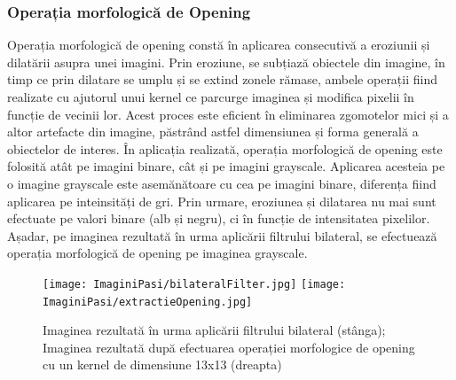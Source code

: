 \documentclass[12pt]{article}
\begin{document}
\subsubsection{Operația morfologic\u{a} de Opening}
Operația morfologic\u{a} de opening const\u{a} \^{i}n aplicarea consecutiv\u{a} a eroziunii și dilat\u{a}rii asupra unei imagini. Prin eroziune, se subțiaz\u{a} obiectele din imagine, \^{i}n timp ce prin dilatare se umplu și se extind zonele r\u{a}mase, ambele operații fiind realizate cu ajutorul unui kernel ce parcurge imaginea și modifica pixelii \^{i}n funcție de vecinii lor. Acest proces este eficient \^{i}n eliminarea zgomotelor mici și a altor artefacte din imagine, p\u{a}str\^{a}nd astfel dimensiunea și forma general\u{a} a obiectelor de interes. \^{I}n aplicația realizat\u{a}, operația morfologic\u{a} de opening este folosit\u{a} at\^{a}t pe imagini binare, c\^{a}t și pe imagini grayscale. Aplicarea acesteia pe o imagine grayscale este asem\u{a}n\u{a}toare cu cea pe imagini binare, diferența fiind aplicarea pe inteinsit\u{a}ți de gri. Prin urmare, eroziunea și dilatarea nu mai sunt efectuate pe valori binare (alb și negru), ci \^{i}n funcție de intensitatea pixelilor. Așadar, pe imaginea rezultat\u{a} \^{i}n urma aplic\u{a}rii filtrului bilateral, se efectueaz\u{a} operația morfologic\u{a} de opening pe imaginea grayscale.

\begin{figure}[H]
  \centering
  \texttt{[image: ImaginiPasi/bilateralFilter.jpg]}\hfill
  \texttt{[image: ImaginiPasi/extractieOpening.jpg]}
  \caption{Imaginea rezultat\u{a} \^{i}n urma aplic\u{a}rii filtrului bilateral (st\^{a}nga); Imaginea rezultat\u{a} dup\u{a} efectuarea operației morfologice de opening cu un kernel de dimensiune 13x13 (dreapta)}
  \label{fig:opening_grayscale}
\end{figure}
\end{document}
